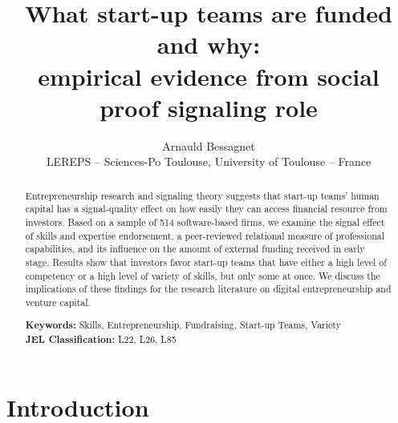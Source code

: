 \documentclass[12pt]{article}
\begin{document}
\title{What start-up teams are funded and why: \\ empirical evidence from social proof signaling role}
\date{\vspace{-3ex}}
\author{Arnauld Bessagnet \\ \footnotesize{LEREPS – Sciences-Po Toulouse, University of Toulouse – France} \\}

\maketitle \vspace{-1,5em}

\begin{abstract}
\noindent
Entrepreneurship research and signaling theory suggests that start-up teams' human capital has a signal-quality effect on how easily they can access financial resource from investors. Based on a sample of 514 software-based firms, we examine the signal effect of skills and expertise endorsement, a peer-reviewed relational measure of professional capabilities, and its influence on the amount of external funding received in early stage. Results show that investors favor start-up teams that have either a high level of competency or a high level of variety of skills, but only some at once. We discuss the implications of these findings for the research literature on digital entrepreneurship and venture capital. \newline

\begin{obeylines}
\noindent \footnotesize{}{\textbf{Keywords:} Skills, Entrepreneurship, Fundraising, Start-up Teams, Variety}
\noindent \footnotesize{\textbf{JEL Classification:} L22, L26, L85}
\end{obeylines}

\end{abstract}

\clearpage
\section{Introduction}


\end{document}
